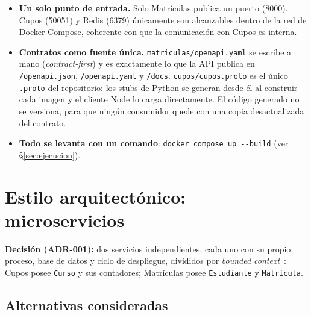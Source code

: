 \documentclass[11pt,spanish]{article}
\begin{document}
\begin{itemize}
    \item \textbf{Un solo punto de entrada.} Solo Matrículas publica un puerto (8000). Cupos (50051) y Redis (6379) únicamente son alcanzables dentro de la red de Docker Compose, coherente con que la comunicación con Cupos es interna.
    \item \textbf{Contratos como fuente única.} \texttt{matriculas/openapi.yaml} se escribe a mano (\emph{contract-first}) y es exactamente lo que la API publica en \texttt{/openapi.json}, \texttt{/openapi.yaml} y \texttt{/docs}. \texttt{cupos/cupos.proto} es el único \texttt{.proto} del repositorio: los stubs de Python se generan desde él al construir cada imagen y el cliente Node lo carga directamente. El código generado no se versiona, para que ningún consumidor quede con una copia desactualizada del contrato.
    \item \textbf{Todo se levanta con un comando}: \texttt{docker compose up -{}-build} (ver \S\ref{sec:ejecucion}).
\end{itemize}

\section{Estilo arquitectónico: microservicios}\label{sec:estilo}

\textbf{Decisión (ADR-001):} dos servicios independientes, cada uno con su propio proceso, base de datos y ciclo de despliegue, divididos por \textit{bounded context}~\cite{evans,newman}: Cupos posee \texttt{Curso} y sus contadores; Matrículas posee \texttt{Estudiante} y \texttt{Matrícula}.

\subsection{Alternativas consideradas}\label{sec:alternativas}
\end{document}

